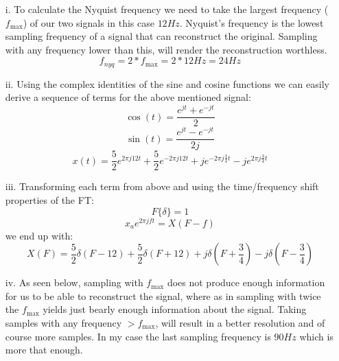 \documentclass[12pt, a4paper]{article}
\begin{document}
\begin{enumerate}
    \begin{enumerate}
        \item[i.] To calculate the Nyquist frequency we need to take the largest frequency (\(f_{\max}\)) of our two signals in this case \(12Hz\).
        Nyquist's frequency is the lowest sampling frequency of a signal that can reconstruct the original. Sampling with any 
        frequency lower than this, will render the reconstruction worthless.
        \[f_{nyq} = 2 * f_{\max} = 2 * 12 Hz = 24Hz\]

        \item[ii.] Using the complex identities of the sine and cosine functions we can easily derive a sequence of terms for the above mentioned signal:
        \[\cos(t) = \frac{e^{jt} + e^{-jt}}{2}\]
        \[\sin(t) = \frac{e^{jt} - e^{-jt}}{2j}\]
        \[x(t) = \frac{5}{2}e^{2\pi j12t} + \frac{5}{2}e^{-2\pi j12t} + je^{-2\pi j\frac{3}{4}t}
        -je^{2\pi j\frac{3}{4}t}\]

        
        \item[iii.] Transforming each term from above and using the time/frequency shift properties of the FT:
        \[F\{ \delta \}=1\]
        \[x_{a}e^{2\pi jft} = X(F-f)\]
        we end up with:
        \[X(F) = \frac{5}{2}\delta(F-12) + \frac{5}{2}\delta(F+12) + 
        j\delta(F+\frac{3}{4}) - j\delta(F-\frac{3}{4})\]

        \item[iv.] As seen below, sampling with \(f_{\max}\) does not produce enough information for us to 
        be able to reconstruct the signal, where as in sampling with twice the \(f_{\max}\) yields just bearly enough information
        about the signal. Taking samples with any frequency \(>f_{\max}\), will result in a better resolution and of course 
        more samples. In my case the last sampling frequency is \(90Hz\) which is more that enough.


\end{enumerate}
\end{enumerate}
\end{document}
